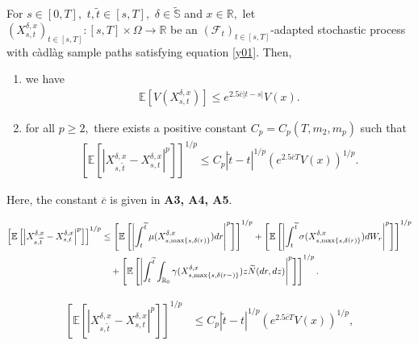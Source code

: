 \documentclass[10pt,a4paper]{amsart}
\newcommand{\bR}{\mathbb{R}}
\newcommand{\mf}{\mathcal{F}}
\begin{document}
\begin{Lem}
\label{Lem3.3}
For $s\in [0, T],$ $t, \widetilde{t} \in [s, T],$ $ \delta \in \widetilde{\mathbb{S}}$ and $ x\in \bR,$ let $(X^{\delta,x}_{s,t})_{t\in[s,T]}:[s,T]  \times\Omega\to\mathbb{R} $ 
be an $(\mf_t)_{t\in[s,T]}$-adapted stochastic process with c\`adl\`ag  sample paths satisfying equation \eqref{y01}. 
Then, 
\begin{enumerate}
   \item [\textup{(i)}] we have
\begin{align*}
\mathbb{E}\left[V(X^{\delta, x}_{s,t})\right] \leq e^{2.5 \overline{c}|t-s|}V(x).
\end{align*} 
\item [\textup{(ii)}] for all $p\ge 2,$ there exists a positive constant $C_p=C_p(T, m_2, m_p)$ such that \begin{align*}
\left[\mathbb{E}\left[\left|X^{\delta, x}_{s,\widetilde{t}}-X^{\delta, x}_{s,t}\right|^p\right]\right]^{1/p} 
 \leq C_p |\widetilde{t} -t|^{1/p} (e^{2.5\overline{c}T}V(x))^{1/p}.
\end{align*} 
\end{enumerate}
Here, the constant $\overline{c}$ is given in {\bf A3, A4, A5}. 
 \end{Lem}

\begin{align} 
\label{Lem3.3.1}
\left[\mathbb{E}\left[\left|X^{\delta, x}_{s,\widetilde{t}}-X^{\delta, x}_{s,t}\right|^p\right]\right]^{1/p} 
&\leq \left[\mathbb{E} \left[\left| \int_t^{\widetilde{t}} \mu(X_{s,\max\{s,\delta(r)\}}^{\delta,x}) dr \right|^p \right]\right]^{1/p} + \left[\mathbb{E} \left[\left| \int_t^{\widetilde{t}} \sigma(X_{s,\max\{s,\delta(r)\}}^{\delta,x}) dW_r \right|^p \right]\right]^{1/p} \notag \\
& \quad + \left[\mathbb{E} \left[\left| \int_t^{\widetilde{t}} \int _{\bR_0}\gamma (X_{s,\max\{s,\delta(r-)\}}^{\delta,x}) z \widetilde{N}(dr, dz) \right|^p\right]\right]^{1/p}.
\end{align}

\begin{align}
\label{Lem3.3.4}
\left[\mathbb{E}\left[\left|X^{\delta, x}_{s,\widetilde{t}}-X^{\delta, x}_{s,t}\right|^p\right]\right]^{1/p} 
&\leq C_p |\widetilde{t} -t|^{1/p} (e^{2.5 \overline{c}T}V(x))^{1/p},
\end{align} 
\end{document}
